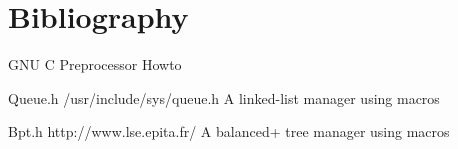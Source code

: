\documentclass[8pt]{beamer}
\begin{document}
%
%

\section{Bibliography}

\begin{thebibliography}{3}

    GNU C Preprocessor Howto

    Queue.h
    \newblock /usr/include/sys/queue.h
    \newblock A linked-list manager using macros

    Bpt.h
    \newblock http://www.lse.epita.fr/
    \newblock A balanced+ tree manager using macros
\end{thebibliography}
\end{document}
